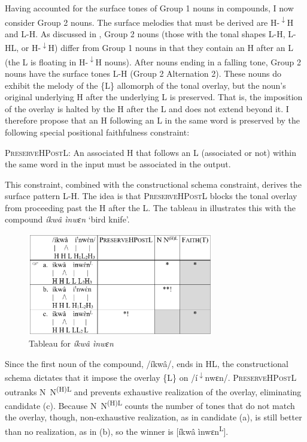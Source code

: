 \documentclass[output=paper]{langscibook}
\begin{document}
Having accounted for the surface tones of Group 1 nouns in compounds, I now consider Group 2 nouns. The surface melodies that must be derived are H-\textsuperscript{$\downarrow$}H and L-H. As discussed in , Group 2 nouns (those with the tonal shapes L-H, L-HL, or H-\textsuperscript{$\downarrow$}H) differ from Group 1 nouns in that they contain an H after an L (the L is floating in H-\textsuperscript{$\downarrow$}H nouns). After nouns ending in a falling tone, Group 2 nouns have the surface tones L-H (Group 2 Alternation 2). These nouns do exhibit the melody of the \{L\} allomorph of the tonal overlay, but the noun’s original underlying H after the underlying L is preserved. That is, the imposition of the overlay is halted by the H after the L and does not extend beyond it. I therefore propose that an H following an L in the same word is preserved by the following special positional faithfulness constraint: 

\ea \label{ex:glewwe:3}
{\textsc{PreserveHPostL:} An associated H that follows an L (associated or not) within the same word in the input must be associated in the output.} \\
\z

This constraint, combined with the constructional schema constraint, derives the surface pattern L-H. The idea is that \textsc{PreserveHPostL} blocks the tonal overlay from proceeding past the H after the L. The tableau in  illustrates this with the compound \textit{íkwâ ìnwɛn} ‘bird knife’.
  
\begin{figure}
\includegraphics[width=81mm]{figures/glewwe-img4.png}
\caption{Tableau for \textit{íkwâ ìnwɛn}}
\label{fig:glewwe:5}
\end{figure}

Since the first noun of the compound, /íkwâ/, ends in HL, the constructional schema dictates that it impose the overlay \{L\} on /í\textsuperscript{$\downarrow$}nwɛn/. \textsc{PreserveHPostL} outranks N~N\textsuperscript{(H)L} and prevents exhaustive realization of the overlay, eliminating candidate (c). Because N~N\textsuperscript{(H)L} counts the number of tones that do not match the overlay, though, non-exhaustive realization, as in candidate (a), is still better than no realization, as in (b), so the winner is [íkwâ ìnwɛn\textsuperscript{L}]. 
\end{document}
